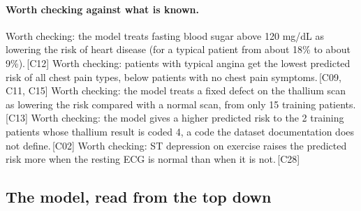 \documentclass[a4paper,10pt]{article}
\newif\ifreviewmarks
\newcommand{\reviewrule}{\noindent{\color{BrickRed}\rule{\linewidth}{0.8pt}}}
\newenvironment{drafted}[1][]{%
  \ifreviewmarks\par\addvspace{\medskipamount}\reviewrule\par\nopagebreak
  \noindent{\color{BrickRed}\sffamily\footnotesize\textbf{Thesis Draft}\quad #1\hfill review}\par\nopagebreak\smallskip\fi}{%
  \ifreviewmarks\par\smallskip\noindent{\color{BrickRed}\sffamily\footnotesize end of thesis draft}\par\nopagebreak\reviewrule\par\medskip\fi}
\begin{document}
\begin{drafted}[plain-language layer: heart-s5-c3]
\paragraph{Worth checking against what is known.} Worth checking: the model treats fasting blood sugar above 120 mg/dL as lowering the risk of heart disease (for a typical patient from about 18\% to about 9\%).\,{\scriptsize\textcolor{NavyBlue}{[C12]}} Worth checking: patients with typical angina get the lowest predicted risk of all chest pain types, below patients with no chest pain symptoms.\,{\scriptsize\textcolor{NavyBlue}{[C09, C11, C15]}} Worth checking: the model treats a fixed defect on the thallium scan as lowering the risk compared with a normal scan, from only 15 training patients.\,{\scriptsize\textcolor{NavyBlue}{[C13]}} Worth checking: the model gives a higher predicted risk to the 2 training patients whose thallium result is coded 4, a code the dataset documentation does not define.\,{\scriptsize\textcolor{NavyBlue}{[C02]}} Worth checking: ST depression on exercise raises the predicted risk more when the resting ECG is normal than when it is not.\,{\scriptsize\textcolor{NavyBlue}{[C28]}}
\subsection{The model, read from the top down}

\end{drafted}
\end{document}
